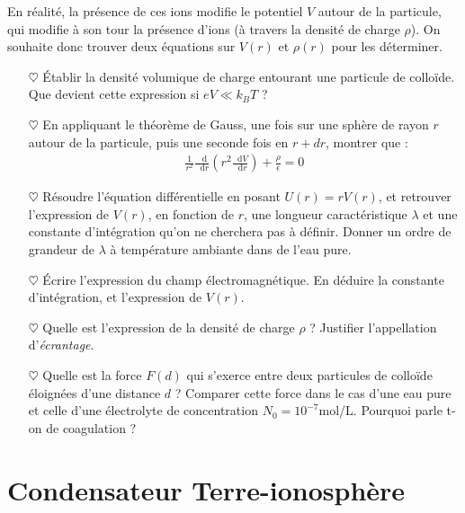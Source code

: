 \documentclass{report}
\newcommand*\dif{\mathop{}\!\mathrm{d}}
\begin{document}
En réalité, la présence de ces ions modifie le potentiel $V$ autour de la particule, qui modifie à son tour la présence d'ions (à travers la densité de charge $\rho$). On souhaite donc trouver deux équations sur $V(r)$ et $\rho(r)$ pour les déterminer. 

\begin{itemize}

	\item[$\heartsuit$] Établir la densité volumique de charge entourant une particule de colloïde. Que devient cette expression si $eV\ll k_BT$ ?
	
	\item[$\heartsuit$] En appliquant le théorème de Gauss, une fois sur une sphère de rayon $r$ autour de la particule, puis une seconde fois en $r+dr$, montrer que : 
	\begin{align*}
		\frac{1}{r^2}\frac{\dif}{\dif r}\left( r^2\frac{\dif V}{\dif r}\right) +\frac{\rho}{\epsilon}=0
	\end{align*}

	\item[$\heartsuit$] Résoudre l'équation différentielle en posant $U(r)=rV(r)$, et retrouver l'expression de $V(r)$, en fonction de $r$, une longueur caractéristique $\lambda$ et une constante d'intégration qu'on ne cherchera pas à définir. Donner un ordre de grandeur de $\lambda$ à température ambiante dans de l'eau pure.
	
	\item[$\heartsuit$] Écrire l'expression du champ électromagnétique. En déduire la constante d'intégration, et l'expression de $V(r)$. 
	
	\item[$\heartsuit$] Quelle est l'expression de la densité de charge $\rho$ ? Justifier l'appellation d'\textit{écrantage}.
	
	\item[$\heartsuit$] Quelle est la force $F(d)$ qui s'exerce entre deux particules de colloïde éloignées d'une distance $d$ ? Comparer cette force dans le cas d'une eau pure et celle d'une électrolyte de concentration $N_0=10^{-7}$mol/L. Pourquoi parle t-on de coagulation ?

\end{itemize} 

\newpage

\section*{Condensateur Terre-ionosphère}
\end{document}
